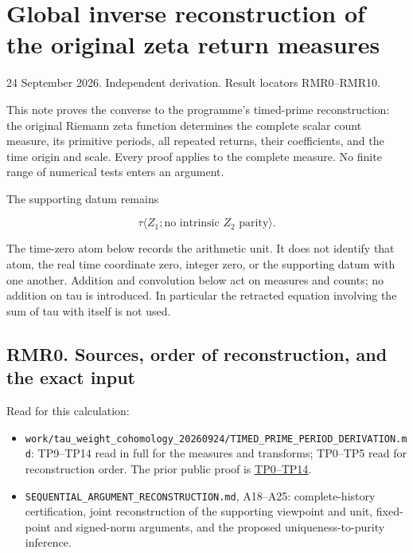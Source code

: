 \section{Global inverse reconstruction of the original zeta return
measures}\label{global-inverse-reconstruction-of-the-original-zeta-return-measures}

24 September 2026. Independent derivation. Result locators RMR0--RMR10.

This note proves the converse to the programme's timed-prime
reconstruction: the original Riemann zeta function determines the
complete scalar count measure, its primitive periods, all repeated
returns, their coefficients, and the time origin and scale. Every proof
applies to the complete measure. No finite range of numerical tests
enters an argument.

The supporting datum remains

\[
\tau\langle Z_1;\text{no intrinsic }Z_2\text{ parity}\rangle.
\]

The time-zero atom below records the arithmetic unit. It does not
identify that atom, the real time coordinate zero, integer zero, or the
supporting datum with one another. Addition and convolution below act on
measures and counts; no addition on tau is introduced. In particular the
retracted equation involving the sum of tau with itself is not used.

\subsection{RMR0. Sources, order of reconstruction, and the exact
input}\label{rmr0.-sources-order-of-reconstruction-and-the-exact-input}

Read for this calculation:

\begin{itemize}
\tightlist
\item
  \texttt{work/tau\_weight\_cohomology\_20260924/TIMED\_PRIME\_PERIOD\_DERIVATION.md}:
  TP9--TP14 read in full for the measures and transforms; TP0--TP5 read
  for reconstruction order. The prior public proof is
  \href{https://github.com/KokunoYumeto/zeta-function-research-reader/blob/32acd0df89ae22c96d2bc30372e4426a31ce4506/workbenches/splitzero-tandem/temporary-arguments/20260924-fixed-generic-point-purity/timed-prime-reconstruction/README.md}{TP0--TP14}.
\item
  \texttt{SEQUENTIAL\_ARGUMENT\_RECONSTRUCTION.md}, A18--A25:
  complete-history certification, joint reconstruction of the supporting
  viewpoint and unit, fixed-point and signed-norm arguments, and the
  proposed uniqueness-to-purity inference.
\end{itemize}

